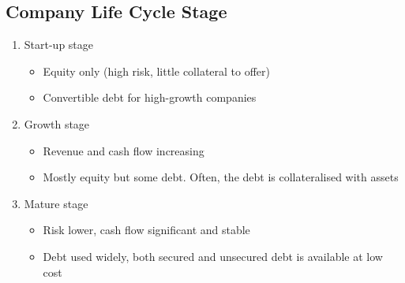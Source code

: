 \documentclass[../notes_compiled.tex]{subfiles}
\begin{document}
\subsection{Company Life Cycle Stage}
\begin{enumerate}
\item Start-up stage
\begin{itemize}
\item Equity only (high risk, little collateral to offer)
\item Convertible debt for high-growth companies
\end{itemize}
\item Growth stage
\begin{itemize}
\item Revenue and cash flow increasing
\item Mostly equity but some debt. Often, the debt is collateralised with assets
\end{itemize}
\item Mature stage
\begin{itemize}
\item Risk lower, cash flow significant and stable
\item Debt used widely, both secured and unsecured debt is available at low cost
\end{itemize}
\end{enumerate}
\end{document}
